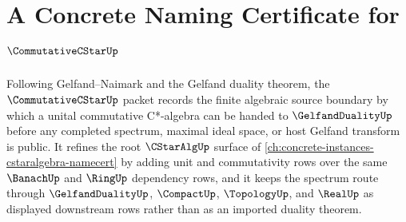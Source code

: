 \chapter{A Concrete Naming Certificate for $\CommutativeCStarUp$}
\label{ch:concrete-instances-commutative-c-star-namecert}

Following Gelfand--Naimark and the Gelfand duality theorem, the $\CommutativeCStarUp$ packet records the finite algebraic source boundary by which a unital commutative C*-algebra can be handed to $\GelfandDualityUp$ before any completed spectrum, maximal ideal space, or host Gelfand transform is public. It refines the root $\CStarAlgUp$ surface of \autoref{ch:concrete-instances-cstaralgebra-namecert} by adding unit and commutativity rows over the same $\BanachUp$ and $\RingUp$ dependency rows, and it keeps the spectrum route through $\GelfandDualityUp$, $\CompactUp$, $\TopologyUp$, and $\RealUp$ as displayed downstream rows rather than as an imported duality theorem.

